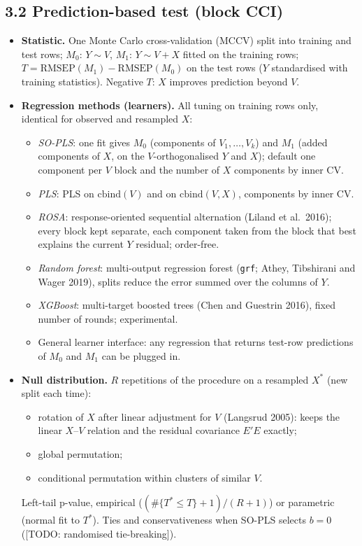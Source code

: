 \documentclass[10pt,leqno]{amsart}
\newcommand{\todo}[1]{{\color{red}[TODO: #1]}}
\newcommand{\fn}[1]{\texttt{#1}}            %
\begin{document}
\subsection*{3.2 Prediction-based test (block CCI)}
\begin{itemize}
\item \textbf{Statistic.} One Monte Carlo cross-validation (MCCV) split into training
  and test rows; $M_0$: $Y\sim V$, $M_1$: $Y\sim V+X$ fitted on the training rows;
  $T=\mathrm{RMSEP}(M_1)-\mathrm{RMSEP}(M_0)$ on the test rows ($Y$ standardised with
  training statistics). Negative $T$: $X$ improves prediction beyond $V$.
\item \textbf{Regression methods (learners).} All tuning on training rows only,
  identical for observed and resampled $X$:
  \begin{itemize}
  \item \emph{SO-PLS}: one fit gives $M_0$ (components of $V_1,\dots,V_k$) and $M_1$
    (added components of $X$, on the $V$-orthogonalised $Y$ and $X$); default one
    component per $V$ block and the number of $X$ components by inner CV.
  \item \emph{PLS}: PLS on $\mathrm{cbind}(V)$ and on $\mathrm{cbind}(V,X)$, components by
    inner CV.
  \item \emph{ROSA}: response-oriented sequential alternation (Liland et al.\ 2016);
    every block kept separate, each component taken from the block that best
    explains the current $Y$ residual; order-free.
  \item \emph{Random forest}: multi-output regression forest (\fn{grf}; Athey,
    Tibshirani and Wager 2019), splits reduce the error summed over the columns of
    $Y$.
  \item \emph{XGBoost}: multi-target boosted trees (Chen and Guestrin 2016),
    fixed number of rounds; experimental.
  \item General learner interface: any regression that returns test-row
    predictions of $M_0$ and $M_1$ can be plugged in.
  \end{itemize}
\item \textbf{Null distribution.} $R$ repetitions of the procedure on a resampled
  $X^*$ (new split each time):
  \begin{itemize}
  \item rotation of $X$ after linear adjustment for $V$ (Langsrud 2005): keeps the
    linear $X$--$V$ relation and the residual covariance $E'E$ exactly;
  \item global permutation;
  \item conditional permutation within clusters of similar $V$.
  \end{itemize}
  Left-tail p-value, empirical ($(\#\{T^*\le T\}+1)/(R+1)$) or parametric (normal
  fit to $T^*$). Ties and conservativeness when SO-PLS selects $b=0$
  (\todo{randomised tie-breaking}).
\end{itemize}
\end{document}
